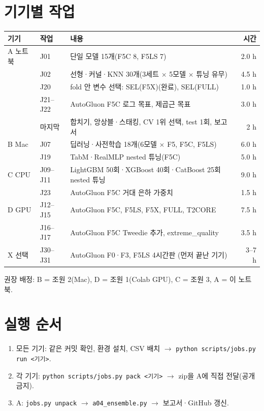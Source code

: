 \documentclass[10pt,a4paper]{article}
\newcommand{\col}[1]{\texttt{\small #1}}
\begin{document}
\section{기기별 작업}
\begin{tabularx}{\linewidth}{@{}l l Y r@{}}
\toprule
기기 & 작업 & 내용 & 시간\\
\midrule
A 노트북 & J01 & 단일 모델 15개(F5C 8, F5LS 7) & 2.0 h\\
 & J02 & 선형·커널·KNN 30개(3세트 $\times$ 5모델 $\times$ 튜닝 유무) & 4.5 h\\
 & J20 & fold 안 변수 선택: SEL(F5X)(완료), SEL(FULL) & 1.0 h\\
 & J21–J22 & AutoGluon F5C 로그 목표, 제곱근 목표 & 3.0 h\\
 & 마지막 & 합치기, 앙상블·스태킹, CV 1위 선택, test 1회, 보고서 & 2 h\\
\midrule
B Mac & J07 & 딥러닝·사전학습 18개(6모델 $\times$ F5, F5C, F5LS) & 6.0 h\\
 & J19 & TabM·RealMLP nested 튜닝(F5C) & 5.0 h\\
\midrule
C CPU & J09–J11 & LightGBM 50회·XGBoost 40회·CatBoost 25회 nested 튜닝 & 9.0 h\\
 & J23 & AutoGluon F5C 거대 은하 가중치 & 1.5 h\\
\midrule
D GPU & J12–J15 & AutoGluon F5C, F5LS, F5X, FULL, T2CORE & 7.5 h\\
 & J16–J17 & AutoGluon F5C Tweedie 추가, extreme\_quality & 3.5 h\\
\midrule
X 선택 & J30–J31 & AutoGluon F0·F3, F5LS 4시간판 (먼저 끝난 기기) & 3–7 h\\
\bottomrule
\end{tabularx}
권장 배정: B = 조원 2(Mac), D = 조원 1(Colab GPU), C = 조원 3, A = 이 노트북.

\section{실행 순서}
\begin{enumerate}
\item 모든 기기: 같은 커밋 확인, 환경 설치, CSV 배치 $\to$ \col{python scripts/jobs.py run <기기>}.
\item 각 기기: \col{python scripts/jobs.py pack <기기>} $\to$ zip을 A에 직접 전달(공개 금지).
\item A: \col{jobs.py unpack} $\to$ \col{a04\_ensemble.py} $\to$ 보고서·GitHub 갱신.
\end{enumerate}
\end{document}
